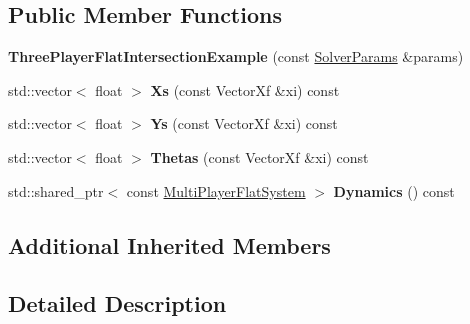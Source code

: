 \subsection*{Public Member Functions}
\begin{DoxyCompactItemize}
\item 
{\bfseries Three\+Player\+Flat\+Intersection\+Example} (const \hyperlink{structilqgames_1_1_solver_params}{Solver\+Params} \&params)\hypertarget{classilqgames_1_1_three_player_flat_intersection_example_aa6a3e8264c12f5c0e424a2a801371a4e}{}\label{classilqgames_1_1_three_player_flat_intersection_example_aa6a3e8264c12f5c0e424a2a801371a4e}

\item 
std\+::vector$<$ float $>$ {\bfseries Xs} (const Vector\+Xf \&xi) const \hypertarget{classilqgames_1_1_three_player_flat_intersection_example_ad4c92ff703b198cf937df281f09d176a}{}\label{classilqgames_1_1_three_player_flat_intersection_example_ad4c92ff703b198cf937df281f09d176a}

\item 
std\+::vector$<$ float $>$ {\bfseries Ys} (const Vector\+Xf \&xi) const \hypertarget{classilqgames_1_1_three_player_flat_intersection_example_a5f60f5d993fec248893fcbda45aad15a}{}\label{classilqgames_1_1_three_player_flat_intersection_example_a5f60f5d993fec248893fcbda45aad15a}

\item 
std\+::vector$<$ float $>$ {\bfseries Thetas} (const Vector\+Xf \&xi) const \hypertarget{classilqgames_1_1_three_player_flat_intersection_example_aaffec79328bcd92dc2d5c8bd0aada196}{}\label{classilqgames_1_1_three_player_flat_intersection_example_aaffec79328bcd92dc2d5c8bd0aada196}

\item 
std\+::shared\+\_\+ptr$<$ const \hyperlink{classilqgames_1_1_multi_player_flat_system}{Multi\+Player\+Flat\+System} $>$ {\bfseries Dynamics} () const \hypertarget{classilqgames_1_1_three_player_flat_intersection_example_a2a4043278484419adf07ed5268453df3}{}\label{classilqgames_1_1_three_player_flat_intersection_example_a2a4043278484419adf07ed5268453df3}

\end{DoxyCompactItemize}
\subsection*{Additional Inherited Members}


\subsection{Detailed Description}


